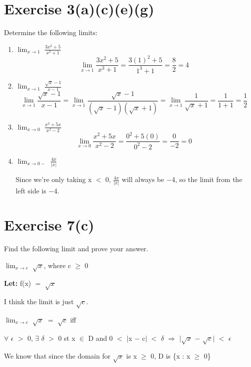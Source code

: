 \documentclass{article}
\newcommand{\mt}[1]{\ensuremath{#1}}
\newcommand\bsc[2][\DefaultOpt]{%
  \def\DefaultOpt{#2}%
  \section[#1]{#2}%
}
\newcommand{\balist}{\begin{enumerate}[label=\alph*.]}
\newcommand{\elist}{\end{enumerate}}
\newcommand{\lt}[1]{\textbf{Let: } #1}
\newcommand{\ep}{\mt{\epsilon} }         %
\newcommand{\fa}{\mt{\forall} }          %
\newcommand{\dta}{\mt{\delta} }
\newcommand{\mem}{\mt{\in} }
\newcommand{\exs}{\mt{\exists} }
\newcommand{\rar}{ \mt{\Rightarrow} }     %
\newcommand{\av}[1]{\mt{|}#1\mt{|}}  %
\newcommand{\bk}[1]{\{#1\}}
\newcommand{\ms}{\mt{-} }
\newcommand{\ls}{\mt{<} }
\newcommand{\gr}{\mt{>} }
\newcommand{\gre}{\mt{\geq} }
\newcommand{\eql}{\mt{=} }
\newcommand{\frc}[2]{\mt{\frac{#1}{#2}}}
\newcommand{\limt}[2]{\mt{\displaystyle{\lim_{#1 \to #2}}}}
\newcommand{\eqn}[1]{\[#1\]}
\begin{document}
\bsc{Exercise 3(a)(c)(e)(g)}{

Determine the following limits:

\balist
\item \limt{x}{1} \frc{3x^2 + 5}{x^3 + 1}
	\eqn{\limt{x}{1} \frc{3x^2 + 5}{x^3 + 1} = \frac{3(1)^2 + 5}{1^3 + 1} = \frac{8}{2} = 4}
\item \limt{x}{1} \frc{\sqrt{x} - 1}{x - 1}
	\eqn{\limt{x}{1} \frc{\sqrt{x} - 1}{x - 1} = \limt{x}{1} \frc{\sqrt{x} - 1}{(\sqrt{x} - 1)(\sqrt{x} + 1)} = \limt{x}{1} \frac{1}{\sqrt{x} + 1} = \frac{1}{1 + 1} = \frac{1}{2}}
\item \limt{x}{0} \frc{x^2 + 5x}{x^2 - 2}
	\eqn{\limt{x}{0} \frc{x^2 + 5x}{x^2 - 2} = \frc{0^2 + 5(0)}{0^2 - 2} = \frac{0}{-2} = 0}
	
\item \limt{x}{0-} \frc{4x}{\av{x}}
	
	Since we're only taking x \ls 0, \frc{4x}{|x|} will always be $-$4, so the limit from the left side is $-$4.
\elist
}

\bsc{Exercise 7(c)}{

Find the following limit and prove your answer.

\limt{x}{c} $\sqrt{x}$, where c \gre 0

\lt{f(x) \eql $\sqrt{x}$}

I think the limit is just $\sqrt{c}$.

\limt{x}{c} $\sqrt{x}$ \eql $\sqrt{c}$ iff

\fa \ep \gr 0, \exs \dta \gr 0 st x \mem D and 0 \ls \av{x \ms c} \ls \dta \rar \av{$\sqrt{x}$ \ms $\sqrt{c}$} \ls \ep

We know that since the domain for $\sqrt{x}$ is x \gre 0, D is \bk{x : x \gre 0}
}
\end{document}
